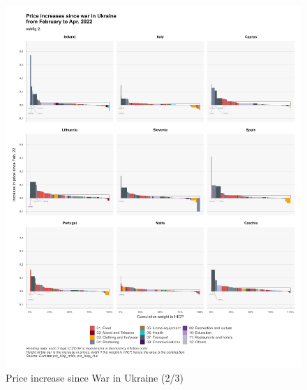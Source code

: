 \documentclass[
  9pt,
  a4paper,
  DIV=11,
  numbers=noendperiod]{scrartcl}
\begin{document}
\begin{figure}

\caption{Price increase since War in Ukraine (2/3)}

{\centering \includegraphics[width=16cm,height=\textheight]{../svg/depuis_wiu_2.png}

}

\end{figure}
\end{document}
